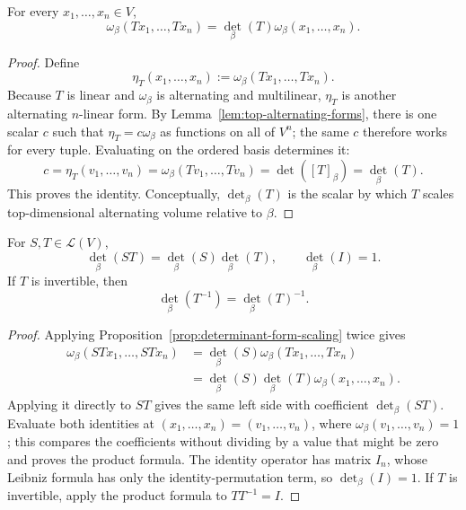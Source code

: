 \begin{proposition}
\label{prop:determinant-form-scaling}
For every \(x_1,\ldots,x_n\in V\),
\[
\omega_\beta(Tx_1,\ldots,Tx_n)
=\det_\beta(T)\omega_\beta(x_1,\ldots,x_n).
\]
\end{proposition}
\begin{proof}
Define
\[
\eta_T(x_1,\ldots,x_n):=\omega_\beta(Tx_1,\ldots,Tx_n).
\]
Because \(T\) is linear and \(\omega_\beta\) is alternating and multilinear,
\(\eta_T\) is another alternating \(n\)-linear form.  By
Lemma~\ref{lem:top-alternating-forms}, there is one scalar \(c\) such that
\(\eta_T=c\omega_\beta\) as functions on all of \(V^n\); the same \(c\)
therefore works for every tuple.  Evaluating on the ordered basis determines
it:
\[
c=\eta_T(v_1,\ldots,v_n)
=\omega_\beta(Tv_1,\ldots,Tv_n)
=\det([T]_\beta)=\det_\beta(T).
\]
This proves the identity.  Conceptually, \(\det_\beta(T)\) is the scalar by
which \(T\) scales top-dimensional alternating volume relative to \(\beta\).
\end{proof}

\begin{theorem}
\label{thm:provisional-determinant-product}
For \(S,T\in\mathcal{L}(V)\),
\[
\det_\beta(ST)=\det_\beta(S)\det_\beta(T),
\qquad
\det_\beta(I)=1.
\]
If \(T\) is invertible, then
\[
\det_\beta(T^{-1})=\det_\beta(T)^{-1}.
\]
\end{theorem}
\begin{proof}
Applying Proposition~\ref{prop:determinant-form-scaling} twice gives
\[
\begin{aligned}
\omega_\beta(STx_1,\ldots,STx_n)
&=\det_\beta(S)\omega_\beta(Tx_1,\ldots,Tx_n)\\
&=\det_\beta(S)\det_\beta(T)
\omega_\beta(x_1,\ldots,x_n).
\end{aligned}
\]
Applying it directly to \(ST\) gives the same left side with coefficient
\(\det_\beta(ST)\).  Evaluate both identities at
\((x_1,\ldots,x_n)=(v_1,\ldots,v_n)\), where
\(\omega_\beta(v_1,\ldots,v_n)=1\); this compares the coefficients without
dividing by a value that might be zero and proves the product formula.  The
identity operator has matrix \(I_n\), whose Leibniz formula has only the
identity-permutation term, so \(\det_\beta(I)=1\).  If \(T\) is invertible,
apply the product formula to \(TT^{-1}=I\).
\end{proof}

